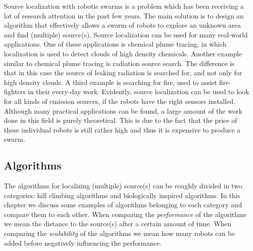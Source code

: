 
Source localization with robotic swarms is a problem which has been receiving a lot of research attention in the past few years. 
The main solution is to design an algorithm that effectively allows a swarm of robots to explore an unknown area and find (multiple) source(s).
Source localization can be used for many real-world applications.
One of these applications is chemical plume tracing, in which localization is used to detect clouds of high density chemicals. \cite{zarzhitsky2005distributed}
Another example similar to chemical plume tracing is radiation source search. \cite{bashyal2008human} 
The difference is that in this case the source of leaking radiation is searched for, and not only for high density clouds. 
A third example is searching for fire, used to assist fire-fighters in their every-day work. \cite{marjovi2009multi}
Evidently, source localization can be used to look for all kinds of emission sources, if the robots have the right sensors installed. \cite{cui2004swarm}
Although many practical applications can be found, a large amount of the work done in this field is purely theoretical.
This is due to the fact that the price of these individual robots is still rather high and thus it is expensive to produce a swarm.


\subsection{Algorithms}
The algorithms for localizing (multiple) source(s) can be roughly divided in two categories: hill climbing algorithms and biologically inspired algorithms.
In this chapter we discuss some examples of algorithms belonging to each category and compare them to each other.
When comparing the \emph{performance} of the algorithms we mean the distance to the source(s) after a certain amount of time. 
When comparing the \emph{scalability} of the algorithms we mean how many robots can be added before negatively influencing the performance. 

